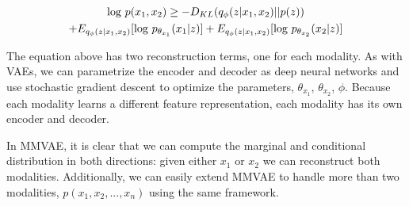 \documentclass{article}
\begin{document}
\begin{multline}
\textup{log }p(x_{1}, x_{2}) \geq -D_{KL}(q_{\phi}(z | x_{1}, x_{2}) || p(z)) \\ + E_{q_{\phi}(z | x_{1}, x_{2})}[\textup{log } p_{\theta_{x_{1}}}(x_{1} | z)] + E_{q_{\phi}(z | x_{1}, x_{2})}[\textup{log } p_{\theta_{x_{2}}}(x_{2} | z)]
\end{multline}

The equation above has two reconstruction terms, one for each modality. As with VAEs, we can parametrize the encoder and decoder as deep neural networks and use stochastic gradient descent to optimize the parameters, $\theta_{x_{1}}$, $\theta_{x_{2}}$, $\phi$. Because each modality learns a different feature representation, each modality has its own encoder and decoder.

In MMVAE, it is clear that we can compute the marginal and conditional distribution in both directions: given either $x_{1}$ or $x_{2}$ we can reconstruct both modalities. Additionally, we can easily extend MMVAE to handle more than two modalities, $p(x_{1}, x_{2}, ..., x_{n})$ using the same framework.
\end{document}
